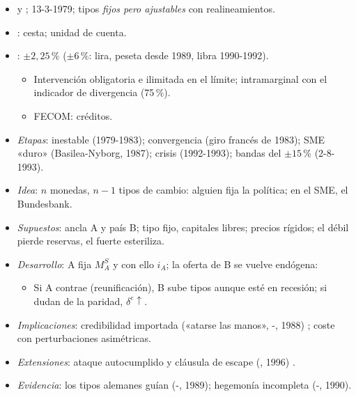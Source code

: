 \documentclass{article}
\begin{document}
\begin{columnas}
\begin{itemize}
\item {} y ; 13-3-1979; tipos \emph{fijos pero ajustables} con realineamientos.
\item {}: cesta; unidad de cuenta.
\item {}: $\pm2{,}25$\,\% ($\pm6$\,\%: lira, peseta desde 1989, libra 1990-1992).
  \begin{itemize}
  \item Intervención obligatoria e ilimitada en el límite; intramarginal con el indicador de divergencia (75\,\%).
  \item FECOM: créditos.
  \end{itemize}
\item \emph{Etapas}: inestable (1979-1983); convergencia (giro francés de 1983); SME «duro» (Basilea-Nyborg, 1987); crisis (1992-1993); bandas del $\pm15$\,\% (2-8-1993).
\end{itemize}
\begin{itemize}
\item \emph{Idea}: $n$ monedas, $n-1$ tipos de cambio: alguien fija la política; en el SME, el Bundesbank.
\item \emph{Supuestos}: ancla A y país B; tipo fijo, capitales libres; precios rígidos; el débil pierde reservas, el fuerte esteriliza.
\item \emph{Desarrollo}: A fija $M^S_A$ y con ello $i_A$; la oferta de B se vuelve endógena:
  \begin{itemize}
  \item Si A contrae (reunificación), B sube tipos aunque esté en recesión; si dudan de la paridad, $\delta^e\uparrow$.
  \end{itemize}
\end{itemize}
\begin{itemize}
\item \emph{Implicaciones}: credibilidad importada («atarse las manos», -, 1988) ; coste con perturbaciones asimétricas.
\item \emph{Extensiones}: ataque autocumplido y cláusula de escape (, 1996) .
\item \emph{Evidencia}: los tipos alemanes guían (-, 1989); hegemonía incompleta (-, 1990).

\end{itemize}
\end{columnas}
\end{document}
